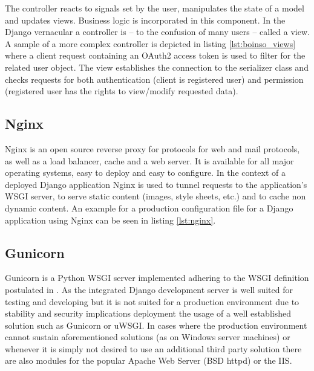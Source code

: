 \documentclass[BachelorPaper]{subfiles}
\begin{document}


The controller reacts to signals set by the user, manipulates the state of a model and updates views. Business logic is incorporated in this component. In the Django vernacular a controller is -- to the confusion of many users -- called a view. A sample of a more complex controller is depicted in listing \ref{lst:boinso_views} where a client request containing an OAuth2 access token is used to filter for the related user object. The view establishes the connection to the serializer class and checks requests for both authentication (client is registered user) and permission (registered user has the rights to view/modify requested data).\\



\subsection{Nginx}
Nginx is an open source reverse proxy for protocols for web and mail protocols, as well as a load balancer, cache and a web server. It is available for all major operating systems, easy to deploy and easy to configure. In the context of a deployed Django application Nginx is used to tunnel requests to the application's \ac{WSGI} server, to serve static content (images, style sheets, etc.) and to cache non dynamic content. An example for a production configuration file for a Django application using Nginx can be seen in listing \ref{lst:nginx}.\\



\subsection{Gunicorn}
Gunicorn is a Python \ac{WSGI} server implemented adhering to the \ac{WSGI} definition postulated in \cite{pep_0333}. As the integrated Django development server is well suited for testing and developing but it is not suited for a production environment due to stability and security implications deployment the usage of a well established solution such as Gunicorn or uWSGI. In cases where the production environment cannot sustain aforementioned solutions (as on Windows server machines) or whenever it is simply not desired to use an additional third party solution there are also modules for the popular Apache Web Server (\ac{BSD} httpd) or the \ac{IIS}.\\
\end{document}
